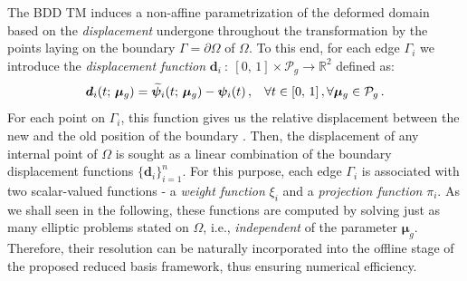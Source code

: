 \documentclass[12pt, a4paper, twoside, openright]{report}
\numberwithin{equation}{chapter}
\theoremstyle{theorem}
\theoremstyle{definition}
\theoremstyle{remark}
\theoremstyle{proposition}
\numberwithin{figure}{chapter}
\newcommand{\wt}[1]{\widetilde{#1}}
\newcommand{\bg}[1]{\boldsymbol{#1}}
\begin{document}
		The BDD TM induces a non-affine parametrization of the deformed domain based on the \emph{displacement} undergone throughout the transformation by the points laying on the boundary $\Gamma = \partial \Omega$ of $\Omega$. To this end, for each edge $\Gamma_i$ we introduce the \emph{displacement function} $\bg{d}_i ~ : ~ [0, \, 1] \times \mathcal{P}_g \rightarrow \mathbb{R}^2$ defined as:
		\begin{equation}
			\bg{d}_i(t; \, \bg{\mu}_g) = \wt{\bg{\psi}}_i(t; \, \bg{\mu}_g) - \bg{\psi}_i(t) \, , \hspace*{0.3cm} \forall t \in [0, \, 1] \, , \forall \bg{\mu}_g \in \mathcal{P}_g \, .
		\end{equation}
		For each point on $\Gamma_i$, this function gives us the relative displacement between the new and the old position of the boundary \cite{JIR14}. Then, the displacement of any internal point of $\Omega$ is sought as a linear combination of the boundary displacement functions $\big\lbrace \bg{d}_i \big\rbrace_{i = 1}^n$. For this purpose, each edge $\Gamma_i$ is associated with two scalar-valued functions - a \emph{weight function} $\xi_i$ and a \emph{projection function} $\pi_i$. As we shall seen in the following, these functions are computed by solving just as many elliptic problems stated on $\Omega$, i.e., \emph{independent} of the parameter $\bg{\mu}_g$. Therefore, their resolution can be naturally incorporated into the offline stage of the proposed reduced basis framework, thus ensuring numerical efficiency. 
		
\end{document}
